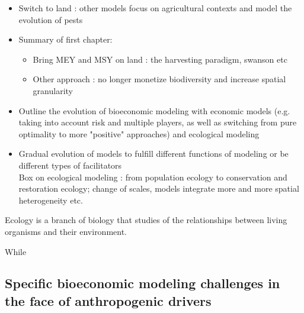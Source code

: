 \begin{itemize}
\item Switch to land : other models focus on agricultural contexts and model the evolution of pests
\item Summary of first chapter:
\begin{itemize}
\item Bring MEY and MSY on land : the harvesting paradigm, swanson etc
\item Other approach : no longer monetize biodiversity and increase spatial granularity
\end{itemize}

\item Outline the evolution of bioeconomic modeling with economic models (e.g. taking into account risk and multiple players, as well as switching from pure optimality to more "positive" approaches) and ecological modeling
\item Gradual evolution of models to fulfill different functions of modeling or be different types of facilitators
\\
Box on ecological modeling : from population ecology to conservation and restoration ecology; change of scales, models integrate more and more spatial heterogeneity etc. 
\end{itemize}

\begin{tcolorbox}[breakable, 
colback=verylightgray, 
colframe=gray!75!black, 
title= {Box 3 - A brief overview of ecological modeling for biodiversity},
fontupper=\small]
\par %
\justifying %
Ecology is a branch of biology that studies of the relationships between living organisms and their environment. 

While 


\end{tcolorbox}

\subsection*{Specific bioeconomic modeling challenges in the face of anthropogenic drivers}

